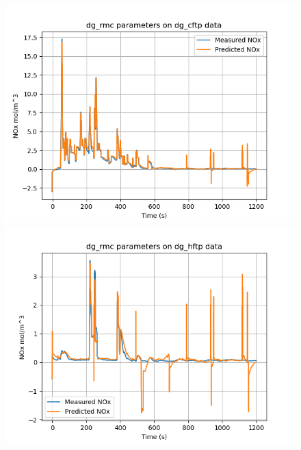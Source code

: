 \begin{figure}[H]
        \begin{minipage}{0.3\textwidth}
                \includegraphics[width = \textwidth]{./figs/figs_new_mdl/dg_rmc_dg_cftp.png}
        \end{minipage}
        \begin{minipage}{0.3\textwidth}
                \includegraphics[width = \textwidth]{./figs/figs_new_mdl/dg_rmc_dg_hftp.png}
        \end{minipage}
        \begin{minipage}{0.3\textwidth}

\end{minipage}
\end{figure}
